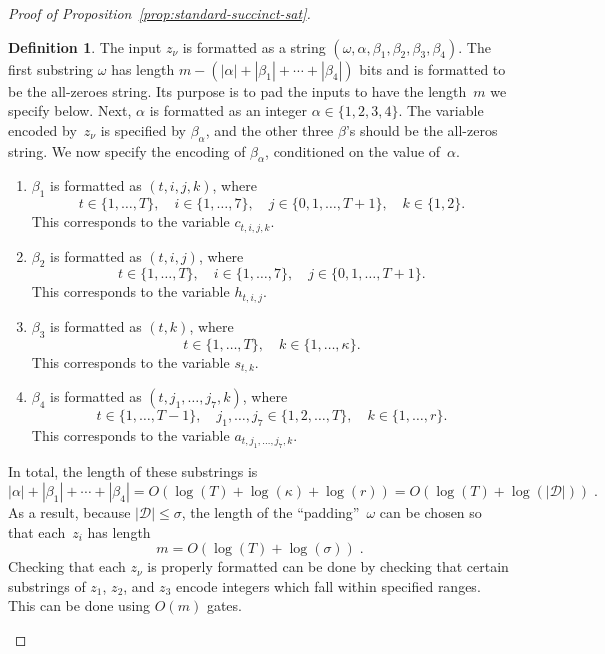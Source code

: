 \documentclass[11pt]{article}
\theoremstyle{definition}
\newtheorem{definition}[theorem]{Definition}
\newcommand{\decider}{\mathcal{D}}
\begin{document}
\begin{proof}[Proof of Proposition~\ref{prop:standard-succinct-sat}]
\begin{definition}
  The input $z_\nu$ is formatted as a string $(\omega, \alpha, \beta_1, \beta_2,
  \beta_3, \beta_4)$.
	The first substring $\omega$ has length $m - (|\alpha| + |\beta_1| + \cdots +
  |\beta_4|)$ bits and is formatted to be the all-zeroes string.
	Its purpose is to pad the inputs to have the length~$m$ we specify below.
	Next, $\alpha$ is formatted as an integer $\alpha \in \{1,2, 3, 4\}$.
	The variable encoded by~$z_\nu$ is specified by $\beta_\alpha$, and the other
  three $\beta$'s should be the all-zeros string.
	We now specify the encoding of $\beta_\alpha$, conditioned on the value
  of~$\alpha$.
	\begin{enumerate}
	\item $\beta_1$ is formatted as $(t, i, j, k)$, where\label{item:a=1}
		\begin{equation*}
      t \in \{1, \ldots, T\}, \quad i \in \{1, \ldots, 7\},
      \quad j \in \{0, 1, \ldots, T+1\}, \quad k \in \{1, 2\}.
		\end{equation*}
		This corresponds to the variable $c_{t, i, j, k}$.
	\item $\beta_2$ is formatted as $(t, i, j)$, where\label{item:a=2}
		\begin{equation*}
      t \in \{1, \ldots, T\}, \quad i \in \{1, \ldots, 7\},
      \quad j \in \{0, 1, \ldots, T+1\}.
		\end{equation*}
		This corresponds to the variable $h_{t, i, j}$.
	\item $\beta_3$ is formatted as $(t, k)$, where\label{item:a=3}
		\begin{equation*}
      t \in \{1, \ldots, T\}, \quad k \in \{1, \ldots, \kappa\}.
		\end{equation*}
		This corresponds to the variable $s_{t, k}$.
	\item $\beta_4$ is formatted as $(t, j_1, \ldots, j_7, k)$, where\label{item:a=4}
		\begin{equation*}
      t \in \{1, \ldots, T-1\}, \quad j_1, \ldots, j_7 \in \{1, 2, \ldots, T\},
      \quad k \in \{1, \ldots, r\}.
		\end{equation*}
		This corresponds to the variable $a_{t, j_1, \ldots, j_7, k}$.
	\end{enumerate}
	In total, the length of these substrings is
	\begin{equation*}
    |\alpha| + |\beta_1| + \cdots + |\beta_4| = O(\log(T) + \log(\kappa) +
    \log(r)) = O(\log(T) + \log(|\decider|))\;.
	\end{equation*}
	As a result, because $|\decider| \leq \sigma$, the length of the
  ``padding''~$\omega$ can be chosen so that each~$z_i$ has length
	\begin{equation}\label{eq:length-of-m}
    m = O(\log(T) + \log(\sigma))\;.
	\end{equation}
	Checking that each $z_\nu$ is properly formatted can be done by checking that
  certain substrings of $z_1$, $z_2$, and $z_3$ encode integers which fall
  within specified ranges.
	This can be done using $O(m)$ gates.


\end{definition}
\end{proof}
\end{document}
